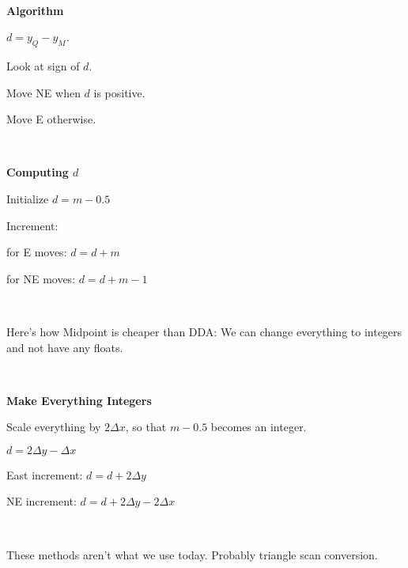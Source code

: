 \

{\bf Algorithm}

$d = y_Q - y_M$.  

Look at sign of $d$.  

Move NE when $d$ is positive.

Move E otherwise.  

\

{\bf Computing $d$}

Initialize $d = m - 0.5$

Increment:

\qquad for E moves:  $d = d+m$

\qquad for NE moves:  $d = d + m - 1$

\

Here's how Midpoint is cheaper than DDA:  We can change everything to integers and not have any floats.  

\

{\bf Make Everything Integers}

Scale everything by $2 \Delta x$, so that $m - 0.5$ becomes an integer.  

$d = 2 \Delta y - \Delta x$

East increment:  $d = d + 2 \Delta y$

NE increment:  $d = d + 2 \Delta y - 2 \Delta x$

\

These methods aren't what we use today.  Probably triangle scan conversion.  

